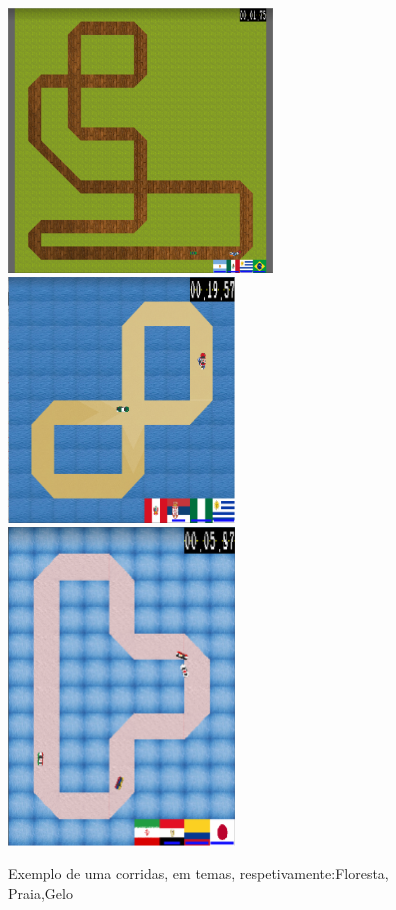 \documentclass[a4paper]{report} %
\begin{document}
\begin{figure}[tb]
\begin{center}
\includegraphics[width=7cm]{Corrida_r_pida.PNG}
\includegraphics[width=6cm]{Praia.PNG}
\includegraphics[width=6cm,]{Gelo.PNG}
\end{center}
\caption{Exemplo de uma corridas, em temas, respetivamente:Floresta, Praia,Gelo}
\end{figure}

\vfill
\clearpage
\end{document}

